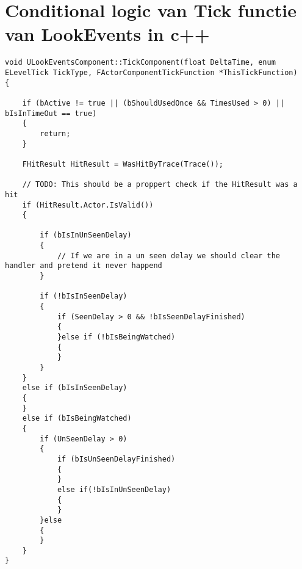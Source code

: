 \chapter{Conditional logic van Tick functie van LookEvents in c++}

\begin{lstlisting}
void ULookEventsComponent::TickComponent(float DeltaTime, enum ELevelTick TickType, FActorComponentTickFunction *ThisTickFunction) 
{

	if (bActive != true || (bShouldUsedOnce && TimesUsed > 0) || bIsInTimeOut == true) 
	{
		return;
	}

	FHitResult HitResult = WasHitByTrace(Trace());

	// TODO: This should be a proppert check if the HitResult was a hit 
	if (HitResult.Actor.IsValid())
	{

		if (bIsInUnSeenDelay) 
		{
			// If we are in a un seen delay we should clear the handler and pretend it never happend
		}

		if (!bIsInSeenDelay) 
		{
			if (SeenDelay > 0 && !bIsSeenDelayFinished) 
			{
			}else if (!bIsBeingWatched) 
			{		
			}
		}
	}
	else if (bIsInSeenDelay)
	{
	}
	else if (bIsBeingWatched) 
	{
		if (UnSeenDelay > 0) 
		{
			if (bIsUnSeenDelayFinished) 
			{				
			}
			else if(!bIsInUnSeenDelay)
			{					
			}
		}else
		{
		}
	}
}
\end{lstlisting}